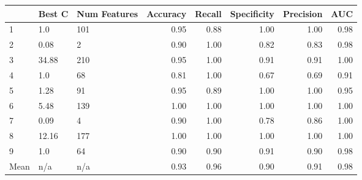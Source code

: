 \begin{tabular}{lllrrrrr}
\toprule
{} & Best C & Num Features &  Accuracy &  Recall &  Specificity &  Precision &   AUC \\
\midrule
1     &    1.0 &          101 &      0.95 &    0.88 &         1.00 &       1.00 &  0.98 \\
2     &   0.08 &            2 &      0.90 &    1.00 &         0.82 &       0.83 &  0.98 \\
3     &  34.88 &          210 &      0.95 &    1.00 &         0.91 &       0.91 &  1.00 \\
4     &    1.0 &           68 &      0.81 &    1.00 &         0.67 &       0.69 &  0.91 \\
5     &   1.28 &           91 &      0.95 &    0.89 &         1.00 &       1.00 &  0.95 \\
6     &   5.48 &          139 &      1.00 &    1.00 &         1.00 &       1.00 &  1.00 \\
7     &   0.09 &            4 &      0.90 &    1.00 &         0.78 &       0.86 &  1.00 \\
8     &  12.16 &          177 &      1.00 &    1.00 &         1.00 &       1.00 &  1.00 \\
9     &    1.0 &           64 &      0.90 &    0.90 &         0.91 &       0.90 &  0.98 \\
Mean &    n/a &          n/a &      0.93 &    0.96 &         0.90 &       0.91 &  0.98 \\
\bottomrule
\end{tabular}
